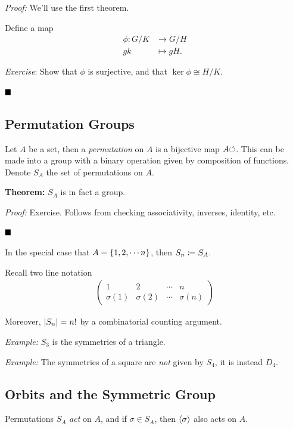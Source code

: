 \emph{Proof:} We'll use the first theorem.

Define a map \begin{align*}
\phi: G/K &\to G/H \\
gk &\mapsto gH
.\end{align*}

\emph{Exercise}: Show that \(\phi\) is surjective, and that
\(\ker \phi \cong H/K\).

\(\qed\)

\hypertarget{permutation-groups}{%
\subsection{Permutation Groups}\label{permutation-groups}}

Let \(A\) be a set, then a \emph{permutation} on \(A\) is a bijective
map \(A {\circlearrowleft}\). This can be made into a group with a binary
operation given by composition of functions. Denote \(S_{A}\) the set of
permutations on \(A\).

\textbf{Theorem:} \(S_{A}\) is in fact a group.

\emph{Proof:} Exercise. Follows from checking associativity, inverses,
identity, etc.

\(\qed\)

In the special case that \(A = \left\{{1, 2, \cdots n}\right\}\), then
\(S_{n} \coloneqq S_{A}\).

Recall two line notation
\begin{align*}
\left(\begin{matrix}
1 & 2 & \cdots & n\\
\sigma(1) & \sigma(2) & \cdots & \sigma(n)
\end{matrix}\right)
\end{align*}

Moreover, \({\left\lvert {S_{n}} \right\rvert} = n!\) by a combinatorial counting argument.

\emph{Example:} \(S_{3}\) is the symmetries of a triangle.

\emph{Example:} The symmetries of a square are \emph{not} given by
\(S_{4}\), it is instead \(D_{4}\).

\hypertarget{orbits-and-the-symmetric-group}{%
\subsection{Orbits and the Symmetric
Group}\label{orbits-and-the-symmetric-group}}

Permutations \(S_{A}\) \emph{act} on \(A\), and if \(\sigma \in S_{A}\),
then \(\left\langle{\sigma}\right\rangle\) also acts on \(A\).

